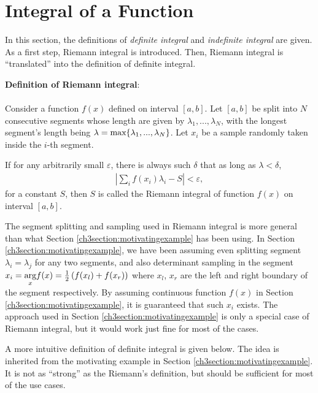\section{Integral of a Function} \label{ch3sec:integraloffunc}

In this section, the definitions of \textit{definite integral} and \textit{indefinite integral} are given. As a first step, Riemann integral is introduced. Then, Riemann integral is ``translated'' into the definition of definite integral.

\begin{mdframed}
\textbf{Definition of Riemann integral}:
\\
\\
Consider a function $f(x)$ defined on interval $[a, b]$. Let $[a, b]$ be split into $N$ consecutive segments whose length are given by $\lambda_1,...,\lambda_N$, with the longest segment's length being $\lambda = \textup{max}\{\lambda_1,...,\lambda_N\}$. Let $x_i$ be a sample randomly taken inside the $i$-th segment.

If for any arbitrarily small $\varepsilon$, there is always such $\delta$ that as long as $\lambda < \delta$,
\begin{eqnarray}
    \left|\sum_{i}f(x_i)\lambda_i - S\right| < \varepsilon, \nonumber
\end{eqnarray}
for a constant $S$, then $S$ is called the Riemann integral of function $f(x)$ on interval $[a, b]$.

\end{mdframed}

The segment splitting and sampling used in Riemann integral is more general than what Section \ref{ch3section:motivatingexample} has been using. In Section \ref{ch3section:motivatingexample}, we have been assuming even splitting segment $\lambda_i = \lambda_j$ for any two segments, and also determinant sampling in the segment $x_i = \underset{x}{\operatorname{\textup{arg}}} f(x) = \frac{1}{2}\left(f(x_l) + f(x_r)\right)$ where $x_l$, $x_r$ are the left and right boundary of the segment respectively. By assuming continuous function $f(x)$ in Section \ref{ch3section:motivatingexample}, it is guaranteed that such $x_i$ exists. The approach used in Section \ref{ch3section:motivatingexample} is only a special case of Riemann integral, but it would work just fine for most of the cases.

A more intuitive definition of definite integral is given below. The idea is inherited from the motivating example in Section \ref{ch3section:motivatingexample}. It is not as ``strong'' as the Riemann's definition, but should be sufficient for most of the use cases.


